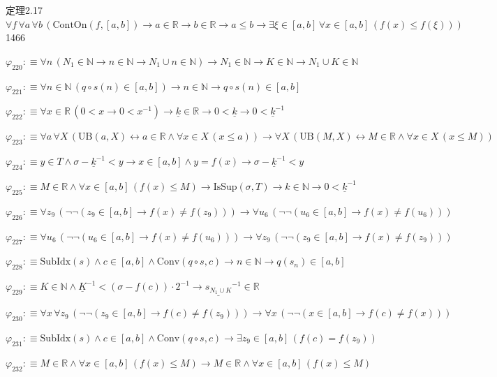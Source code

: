 \begin{fullproof}{定理2.17}{$\forall f\,\forall a\,\forall b\,(\mathrm{ContOn}(f,[a,b]) \to a \in \mathbb{R} \to b \in \mathbb{R} \to a \leq b \to \exists \xi \in [a,b]\,\forall x \in [a,b]\,(f(x) \leq f(\xi)))$}{1466}
\begin{abbrevlist}
\item $\varphi_{220} :\equiv \forall n\,(N_{1} \in \mathbb{N} \to n \in \mathbb{N} \to N_{1} \cup n \in \mathbb{N}) \to N_{1} \in \mathbb{N} \to K \in \mathbb{N} \to N_{1} \cup K \in \mathbb{N}$
\item $\varphi_{221} :\equiv \forall n \in \mathbb{N}\,(q \circ s(n) \in [a,b]) \to n \in \mathbb{N} \to q \circ s(n) \in [a,b]$
\item $\varphi_{222} :\equiv \forall x \in \mathbb{R}\,(0 < x \to 0 < x^{-1}) \to \underline{k} \in \mathbb{R} \to 0 < \underline{k} \to 0 < \underline{k}^{-1}$
\item $\varphi_{223} :\equiv \forall a\,\forall X\,(\mathrm{UB}(a,X) \leftrightarrow a \in \mathbb{R} \land \forall x \in X\,(x \leq a)) \to \forall X\,(\mathrm{UB}(M,X) \leftrightarrow M \in \mathbb{R} \land \forall x \in X\,(x \leq M))$
\item $\varphi_{224} :\equiv y \in T \land \sigma - \underline{k}^{-1} < y \to x \in [a,b] \land y = f(x) \to \sigma - \underline{k}^{-1} < y$
\item $\varphi_{225} :\equiv M \in \mathbb{R} \land \forall x \in [a,b]\,(f(x) \leq M) \to \mathrm{IsSup}(\sigma,T) \to k \in \mathbb{N} \to 0 < \underline{k}^{-1}$
\item $\varphi_{226} :\equiv \forall z_{9}\,(\neg \neg (z_{9} \in [a,b] \to f(x) \neq f(z_{9}))) \to \forall u_{6}\,(\neg \neg (u_{6} \in [a,b] \to f(x) \neq f(u_{6})))$
\item $\varphi_{227} :\equiv \forall u_{6}\,(\neg \neg (u_{6} \in [a,b] \to f(x) \neq f(u_{6}))) \to \forall z_{9}\,(\neg \neg (z_{9} \in [a,b] \to f(x) \neq f(z_{9})))$
\item $\varphi_{228} :\equiv \mathrm{SubIdx}(s) \land c \in [a,b] \land \mathrm{Conv}(q \circ s,c) \to n \in \mathbb{N} \to q(s_{n}) \in [a,b]$
\item $\varphi_{229} :\equiv K \in \mathbb{N} \land \underline{K}^{-1} < (\sigma - f(c)) \cdot 2^{-1} \to \underline{s_{N_{1} \cup K}}^{-1} \in \mathbb{R}$
\item $\varphi_{230} :\equiv \forall x\,\forall z_{9}\,(\neg \neg (z_{9} \in [a,b] \to f(c) \neq f(z_{9}))) \to \forall x\,(\neg \neg (x \in [a,b] \to f(c) \neq f(x)))$
\item $\varphi_{231} :\equiv \mathrm{SubIdx}(s) \land c \in [a,b] \land \mathrm{Conv}(q \circ s,c) \to \exists z_{9} \in [a,b]\,(f(c) = f(z_{9}))$
\item $\varphi_{232} :\equiv M \in \mathbb{R} \land \forall x \in [a,b]\,(f(x) \leq M) \to M \in \mathbb{R} \land \forall x \in [a,b]\,(f(x) \leq M)$

\end{abbrevlist}
\end{fullproof}
